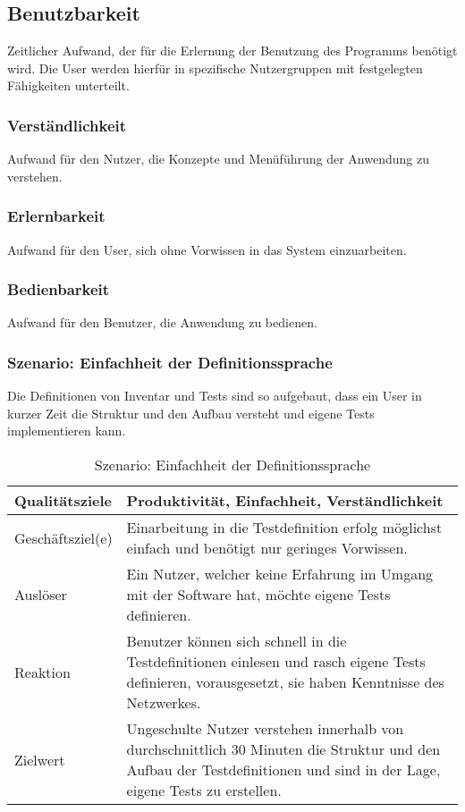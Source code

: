 \documentclass[
	ngerman,
	toc=listof, %
	toc=bibliography, %
	footnotes=multiple, %
	parskip=half, %
	numbers=noendperiod %
]{scrartcl}
\begin{document}
			\newpage

	\subsection{Benutzbarkeit}
		Zeitlicher Aufwand, der für die Erlernung der Benutzung des Programms benötigt wird. 
		Die User werden hierfür in spezifische Nutzergruppen mit festgelegten Fähigkeiten unterteilt.
		
		\subsubsection{Verständlichkeit}
			Aufwand für den Nutzer, die Konzepte und Menüführung der Anwendung zu verstehen.

		\subsubsection{Erlernbarkeit}
			Aufwand für den User, sich ohne Vorwissen in das System einzuarbeiten.

		\subsubsection{Bedienbarkeit}
			Aufwand für den Benutzer, die Anwendung zu bedienen.

		\subsubsection{Szenario: Einfachheit der Definitionssprache}
			Die Definitionen von Inventar und Tests sind so aufgebaut, dass ein User in kurzer Zeit die Struktur und den Aufbau versteht und eigene Tests implementieren kann.
			
			\begin{table}[!h]
				\begin{tabularx}{\textwidth}{lX}
					\toprule
					Qualitätsziele & Produktivität, Einfachheit, Verständlichkeit \\
					\midrule
					Geschäftsziel(e) & Einarbeitung in die Testdefinition erfolg möglichst einfach und benötigt nur geringes Vorwissen.  \\
					\midrule
					Auslöser & Ein Nutzer, welcher keine Erfahrung im Umgang mit der Software hat, möchte eigene Tests definieren.  \\
					\midrule
					Reaktion & Benutzer können sich schnell in die Testdefinitionen einlesen und rasch eigene Tests definieren, vorausgesetzt, sie haben Kenntnisse des Netzwerkes.  \\
					\midrule
					Zielwert & Ungeschulte Nutzer verstehen innerhalb von durchschnittlich 30 Minuten die Struktur und den Aufbau der Testdefinitionen und sind in der Lage, eigene Tests zu erstellen.  \\
					\bottomrule
				\end{tabularx}
				\caption{Szenario: Einfachheit der Definitionssprache}
			\end{table}
			\newpage
			
\end{document}
